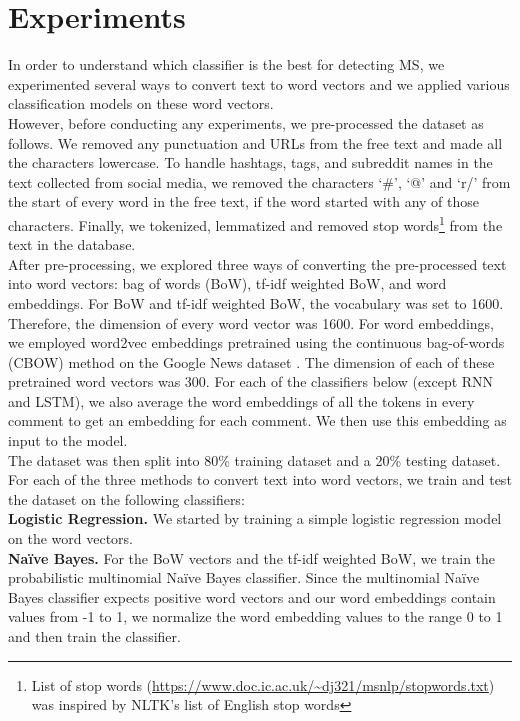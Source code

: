 \documentclass[11pt,a4paper]{article}
\begin{document}
\section{Experiments}
In order to understand which classifier is the best for detecting MS, we experimented several ways to convert text to word vectors and we applied various classification models on these word vectors. \\
\indent However, before conducting any experiments, we pre-processed the dataset as follows. We removed any punctuation and URLs from the free text and made all the characters lowercase. To handle hashtags, tags, and subreddit names in the text collected from social media, we removed the characters ‘\#’, ‘@’ and ‘r/’ from the start of every word in the free text, if the word started with any of those characters. Finally, we tokenized, lemmatized and removed stop words\footnote{List of stop words (\url{https://www.doc.ic.ac.uk/~dj321/msnlp/stopwords.txt}) was inspired by NLTK's list of English stop words} from the text in the database. \\
\indent After pre-processing, we explored three ways of converting the pre-processed text into word vectors: bag of words (BoW), tf-idf weighted BoW, and word embeddings. For BoW and tf-idf weighted BoW, the vocabulary was set to 1600. Therefore, the dimension of every word vector was 1600. For word embeddings, we employed word2vec embeddings pretrained using the continuous bag-of-words (CBOW) method on the Google News dataset \citep{Mikolav:13}. The dimension of each of these pretrained word vectors was 300. For each of the classifiers below (except RNN and LSTM), we also average the word embeddings of all the tokens in every comment to get an embedding for each comment. We then use this embedding as input to the model. \\
\indent The dataset was then split into 80\% training dataset and a 20\% testing dataset. For each of the three methods to convert text into word vectors, we train and test the dataset on the following classifiers: \\
\indent \textbf{Logistic Regression.} We started by training a simple logistic regression model on the word vectors. \\
\indent \textbf{Naïve Bayes.} For the BoW vectors and the tf-idf weighted BoW, we train the probabilistic multinomial Naïve Bayes classifier. Since the multinomial Naïve Bayes classifier expects positive word vectors and our word embeddings contain values from -1 to 1, we normalize the word embedding values to the range 0 to 1 and then train the classifier. \\
\end{document}
